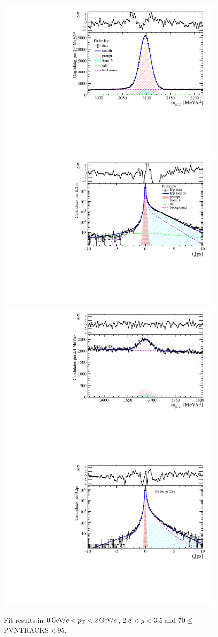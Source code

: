 \begin{figure}[H]
\begin{center}
\includegraphics[width=0.47\linewidth]{pdf/Jpsi/drawmass/n4y2pt1.pdf}
\includegraphics[width=0.47\linewidth]{pdf/Jpsi/2DFit/n4y2pt1.pdf}
\vspace*{-0.5cm}
\includegraphics[width=0.47\linewidth]{pdf/Psi2S/drawmass/n4y2pt1.pdf}
\includegraphics[width=0.47\linewidth]{pdf/Psi2S/2DFit/n4y2pt1.pdf}
\vspace*{-0.5cm}
\end{center}
\caption{Fit results in $0\text{\,Ge\kern -0.1em V\!/}c<p_{\mathrm{T}}<2\text{\,Ge\kern -0.1em V\!/}c$, $2.8<y<3.5$ and 70$\leq$PVNTRACKS$<$95.}
\label{Fitn4y2pt1}
\end{figure}
